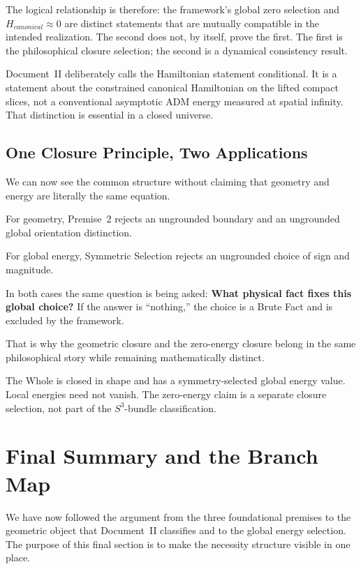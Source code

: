 \documentclass[11pt]{article}
\theoremstyle{canonstyle}
\def\mathrm#1{#1}%
\begin{document}
The logical relationship is therefore: the framework's global zero selection and $H_{\mathrm{canonical}} \approx 0$ are distinct statements that are mutually compatible in the intended realization. The second does not, by itself, prove the first. The first is the philosophical closure selection; the second is a dynamical consistency result.

\begin{forthecurious}
Document~II deliberately calls the Hamiltonian statement conditional. It is a statement about the constrained canonical Hamiltonian on the lifted compact slices, not a conventional asymptotic ADM energy measured at spatial infinity. That distinction is essential in a closed universe.
\end{forthecurious}

\subsection{One Closure Principle, Two Applications}

We can now see the common structure without claiming that geometry and energy are literally the same equation.

For geometry, Premise~2 rejects an ungrounded boundary and an ungrounded global orientation distinction.

For global energy, Symmetric Selection rejects an ungrounded choice of sign and magnitude.

In both cases the same question is being asked: \textbf{What physical fact fixes this global choice?} If the answer is ``nothing,'' the choice is a Brute Fact and is excluded by the framework.

That is why the geometric closure and the zero-energy closure belong in the same philosophical story while remaining mathematically distinct.

\begin{plainwords}
The Whole is closed in shape and has a symmetry-selected global energy value. Local energies need not vanish. The zero-energy claim is a separate closure selection, not part of the $S^3$-bundle classification.
\end{plainwords}

\newpage
\section{Final Summary and the Branch Map}

We have now followed the argument from the three foundational premises to the geometric object that Document~II classifies and to the global energy selection. The purpose of this final section is to make the necessity structure visible in one place.
\end{document}
